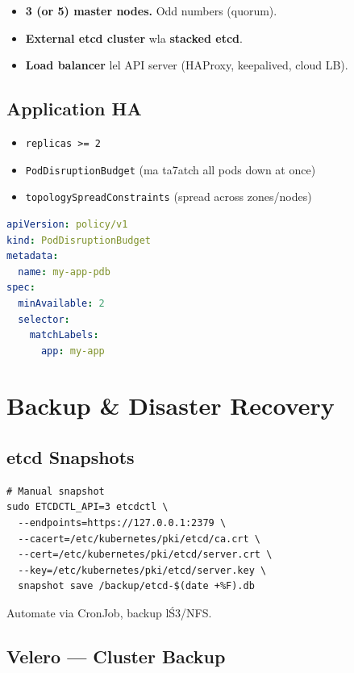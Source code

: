 \documentclass[11pt,a4paper]{book}
\begin{document}
\begin{itemize}
  \item \textbf{3 (or 5) master nodes.} Odd numbers (quorum).
  \item \textbf{External etcd cluster} wla \textbf{stacked etcd}.
  \item \textbf{Load balancer} lel API server (HAProxy, keepalived, cloud LB).
\end{itemize}

\subsection{Application HA}

\begin{itemize}
  \item \texttt{replicas >= 2}
  \item \texttt{PodDisruptionBudget} (ma ta7atch all pods down at once)
  \item \texttt{topologySpreadConstraints} (spread across zones/nodes)
\end{itemize}

\begin{lstlisting}[language=yaml,caption={PodDisruptionBudget}]
apiVersion: policy/v1
kind: PodDisruptionBudget
metadata:
  name: my-app-pdb
spec:
  minAvailable: 2
  selector:
    matchLabels:
      app: my-app
\end{lstlisting}

\section{Backup \& Disaster Recovery}

\subsection{etcd Snapshots}

\begin{lstlisting}
# Manual snapshot
sudo ETCDCTL_API=3 etcdctl \
  --endpoints=https://127.0.0.1:2379 \
  --cacert=/etc/kubernetes/pki/etcd/ca.crt \
  --cert=/etc/kubernetes/pki/etcd/server.crt \
  --key=/etc/kubernetes/pki/etcd/server.key \
  snapshot save /backup/etcd-$(date +%F).db
\end{lstlisting}

Automate via CronJob, backup l\'S3/NFS.

\subsection{Velero --- Cluster Backup}
\end{document}
